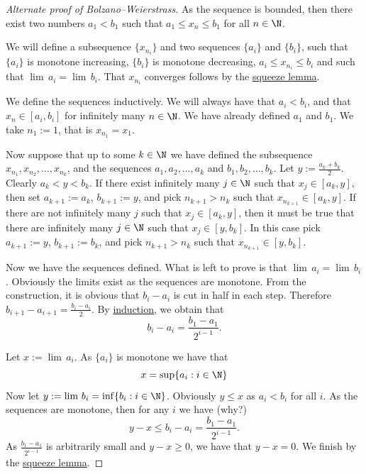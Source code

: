 \documentclass[12pt]{book}
\begin{document}
\begin{proof}[Alternate proof of Bolzano--Weierstrass]
As the sequence is bounded, then there exist two numbers $a_1 < b_1$
such that $a_1 \leq x_n \leq b_1$ for all $n \in \N$.

We will define a subsequence $\{ x_{n_i} \}$ and two
sequences $\{ a_i \}$ and $\{ b_i \}$, such that
$\{ a_i \}$ is monotone increasing, $\{ b_i \}$ is monotone decreasing,
$a_i \leq x_{n_i} \leq b_i$ and such that $\lim\, a_i = \lim\, b_i$.   
That $x_{n_i}$ converges follows by the \hyperref[squeeze:lemma]{squeeze lemma}.

We define the sequences inductively.
We will always have that $a_i < b_i$,
and that $x_n \in [a_i,b_i]$ for infinitely many
$n \in \N$.
We have already defined $a_1$ and $b_1$.
We take $n_1 := 1$, that is
$x_{n_1} = x_1$.

Now suppose that up to some $k \in \N$
we have defined the subsequence $x_{n_1}, x_{n_2}, \ldots,
x_{n_k}$, and the sequences $a_1,a_2,\ldots,a_k$
and $b_1,b_2,\ldots,b_k$.
Let $y := \frac{a_k+b_k}{2}$.
Clearly
$a_k < y < b_k$.
If there exist infinitely many $j \in \N$
such that $x_j \in [a_k,y]$, then set $a_{k+1} := a_k$, $b_{k+1} := y$,
and pick $n_{k+1} > n_{k}$
such that $x_{n_{k+1}} \in [a_k,y]$.
If there are not infinitely many 
$j$ such that 
$x_j \in [a_k,y]$, then it must be true that there are infinitely many $j \in
\N$ such that 
$x_j \in [y,b_k]$.
In this case pick $a_{k+1} := y$, $b_{k+1} := b_k$,
and pick $n_{k+1} > n_{k}$
such that $x_{n_{k+1}} \in [y,b_k]$.

Now we have the sequences defined.
What is left to prove is that
$\lim\, a_i = \lim\, b_i$.
Obviously the limits exist as the sequences
are monotone.
From the construction, it is obvious that
$b_i - a_i$ is cut in half in each step.
Therefore
$b_{i+1} - a_{i+1} = \frac{b_i-a_i}{2}$.
By
\hyperref[induction:thm]{induction}, we obtain that
\begin{equation*}
b_i - a_i = \frac{b_1-a_1}{2^{i-1}} .
\end{equation*}

Let $x := \lim\, a_i$.
As $\{ a_i \}$ is monotone we have that
\begin{equation*}
x = \sup \{ a_i : i \in \N \}
\end{equation*}
Now let $y := \lim\, b_i = \inf \{ b_i : i \in \N \}$.
Obviously
$y \leq x$ as $a_i < b_i$ for all $i$.
As the sequences are monotone, then
for any $i$ we have (why?)
\begin{equation*}
y-x \leq b_i-a_i = \frac{b_1-a_1}{2^{i-1}} .
\end{equation*}
As $\frac{b_1-a_1}{2^{i-1}}$ is arbitrarily small and $y-x \geq 0$,
we have that $y-x = 0$.
We finish by the \hyperref[squeeze:lemma]{squeeze lemma}.
\end{proof}
\end{document}
